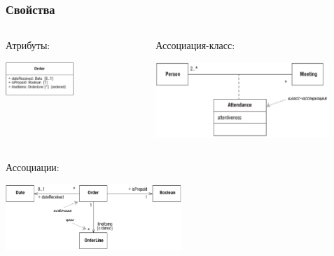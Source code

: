 \documentclass{../mcsslides}
\begin{document}
    \begin{frame}
        \frametitle{Свойства}
        \begin{columns}
            \begin{column}{0.5\textwidth}
                Атрибуты:
                \begin{center}
                    \includegraphics[width=0.5\textwidth]{attributes.png}
                \end{center}
            \end{column}
            \begin{column}{0.5\textwidth}
                Ассоциация-класс:
                \begin{center}
                    \includegraphics[width=0.85\textwidth]{classAssociation.png}
                \end{center}
            \end{column}
        \end{columns}
        \vspace{5mm}
        Ассоциации:
        \begin{center}
            \includegraphics[width=0.5\textwidth]{associations.png}
        \end{center}
    \end{frame}
\end{document}
